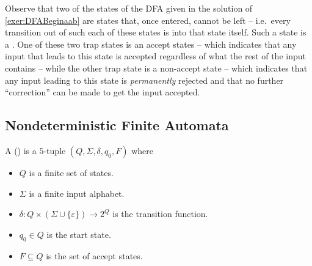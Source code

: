 
Observe that two of the states of the DFA given in the solution of \cref{exer:DFABeginaab} are states that, once entered, cannot be left -- i.e.\ every transition out of such each of these states is into that state itself. Such a state is a . One of these two trap states is an accept states -- which indicates that any input that leads to this state is accepted regardless of what the rest of the input contains -- while the other trap state is a non-accept state -- which indicates that any input leading to this state is \emph{permanently} rejected and that no further ``correction'' can be made to get the input accepted.

\subsection{Nondeterministic Finite Automata}\label{subsec:NFA}

A  () is a $5$-tuple $(Q, \Sigma, \delta, q_0, F)$ where
\begin{itemize}
\item $Q$ is a finite set of states.
\item $\Sigma$ is a finite input alphabet.
\item $\delta \colon Q \times (\Sigma \cup \{\varepsilon\}) \to 2^Q$ is the transition function.
\item $q_0 \in Q$ is the start state.
\item $F \subseteq Q$ is the set of accept states.
\end{itemize}

